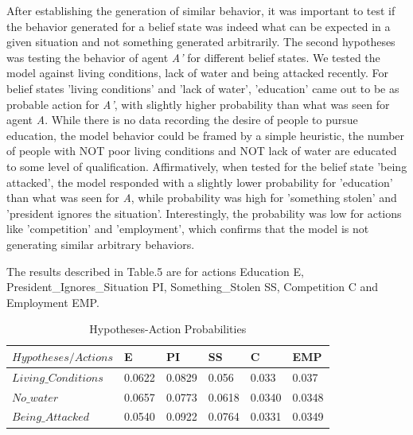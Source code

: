 {After establishing the generation of similar behavior, it was important to test if the behavior generated for a belief state was indeed what can be expected in a given situation and not something generated arbitrarily. The second hypotheses was testing the behavior of agent \textit{A'} for different belief states. We tested the model against living conditions, lack of water and being attacked recently.  For belief states 'living conditions' and 'lack of water', 'education' came out to be as probable action for \textit{A'}, with slightly higher probability than what was seen for agent \textit{A}. While there is no data recording the desire of people to pursue education, the model behavior could be framed by a simple heuristic, the number of people with NOT poor living conditions and NOT lack of water are educated to some level of qualification. Affirmatively, when tested for the belief state 'being attacked', the model responded with a slightly lower probability for 'education' than what was seen for \textit{A}, while probability was high for 'something stolen' and 'president ignores the situation'. Interestingly, the probability was low for actions like 'competition' and 'employment', which confirms that the model is not generating similar arbitrary behaviors.

The results described in Table.5 are for actions Education E, President\_Ignores\_Situation PI, Something\_Stolen SS, Competition C and Employment EMP. 
 
\begin{table}[!th]
	
	\caption{Hypotheses-Action Probabilities }
	\begin{tabular}{|l|l|l|l|l|l|}
		\hline
	$ Hypotheses/Actions$	& E & PI & SS & C & EMP \\
		
		\hline			
		$ Living\_Conditions$    &     0.0622 & 0.0829 & 0.056 & 0.033 & 0.037        \\ 
		
		       
		\hline
		$ No\_water$             &      0.0657 & 0.0773 & 0.0618 & 0.0340 & 0.0348       \\ 
		
		    
		\hline
		$ Being\_Attacked $          &     0.0540 & 0.0922 & 0.0764 & 0.0331 & 0.0349         \\ 
		
		    
		
		    
		\hline						
	\end{tabular}
	\label{tab:random}
\end{table}
 
}
